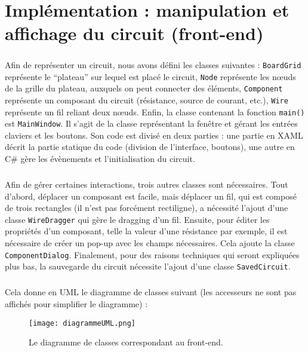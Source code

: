 \chapter{Implémentation : manipulation et affichage du circuit (front-end)}

\paragraph{}Afin de représenter un circuit, nous avons défini les classes suivantes : \lstinline|BoardGrid| représente le \enquote{plateau} sur lequel est placé le circuit, \lstinline|Node| représente les nœuds de la grille du plateau, auxquels on peut connecter des éléments, \lstinline|Component| représente un composant du circuit (résistance, source de courant, etc.), \lstinline|Wire| représente un fil reliant deux nœuds. Enfin, la classe contenant la fonction \lstinline|main()| est \lstinline|MainWindow|. Il s'agit de la classe représentant la fenêtre et gérant les entrées claviers et les boutons. Son code est divisé en deux parties : une partie en XAML décrit la partie statique du code (division de l'interface, boutons), une autre en C\# gère les évènements et l'initialisation du circuit.

\paragraph{}Afin de gérer certaines interactions, trois autres classes sont nécessaires. Tout d'abord, déplacer un composant est facile, mais déplacer un fil, qui est composé de trois rectangles (il n'est pas forcément rectiligne), a nécessité l'ajout d'une classe \lstinline|WireDragger| qui gère le dragging d'un fil. Ensuite, pour éditer les propriétés d'un composant, telle la valeur d'une résistance par exemple, il est nécessaire de créer un pop-up avec les champs nécessaires. Cela ajoute la classe \lstinline|ComponentDialog|. Finalement, pour des raisons techniques qui seront expliquées plus bas, la sauvegarde du circuit nécessite l'ajout d'une classe \lstinline|SavedCircuit|.

\paragraph{}Cela donne en UML le diagramme de classes suivant (les accesseurs ne sont pas affichés pour simplifier le diagramme) :

\begin{figure}[H]
	\centering
	\texttt{[image: diagrammeUML.png]}
	\caption{Le diagramme de classes correspondant au front-end.}
	\label{fig:UML}
\end{figure}


